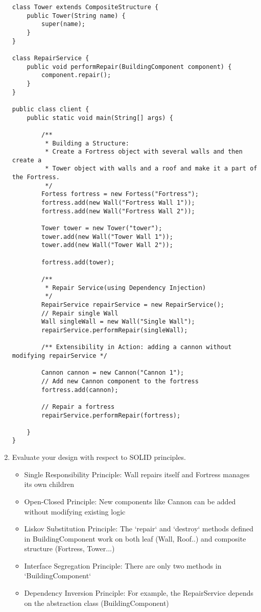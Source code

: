 \begin{enumerate}
\begin{verbatim}
class Tower extends CompositeStructure {
    public Tower(String name) {
        super(name);
    }
}

class RepairService {
    public void performRepair(BuildingComponent component) {
        component.repair();
    }
}

public class client {
    public static void main(String[] args) {

        /**
         * Building a Structure:
         * Create a Fortress object with several walls and then create a
         * Tower object with walls and a roof and make it a part of the Fortress.
         */
        Fortess fortress = new Fortess("Fortress");
        fortress.add(new Wall("Fortress Wall 1"));
        fortress.add(new Wall("Fortress Wall 2"));

        Tower tower = new Tower("tower");
        tower.add(new Wall("Tower Wall 1"));
        tower.add(new Wall("Tower Wall 2"));

        fortress.add(tower);

        /**
         * Repair Service(using Dependency Injection)
         */
        RepairService repairService = new RepairService();
        // Repair single Wall
        Wall singleWall = new Wall("Single Wall");
        repairService.performRepair(singleWall);

        /** Extensibility in Action: adding a cannon without modifying repairService */

        Cannon cannon = new Cannon("Cannon 1");
        // Add new Cannon component to the fortress
        fortress.add(cannon);

        // Repair a fortress
        repairService.performRepair(fortress);

    }
}
    \end{verbatim}

    \item Evaluate your design with respect to SOLID principles. 

    \begin{itemize}
        \item Single Responsibility Principle: Wall repairs itself and Fortress manages its own children 
        \item Open-Closed Principle: New components like Cannon can be added without modifying existing logic
        \item Liskov Substitution Principle: The `repair` and `destroy` methods defined in BuildingComponent work on both leaf (Wall, Roof..) and composite structure (Fortress, Tower...)
        \item Interface Segregation Principle: There are only two methods in `BuildingComponent`
        \item Dependency Inversion Principle: For example, the RepairService depends on the abstraction class (BuildingComponent)
    \end{itemize}

\end{enumerate}
\clearpage

